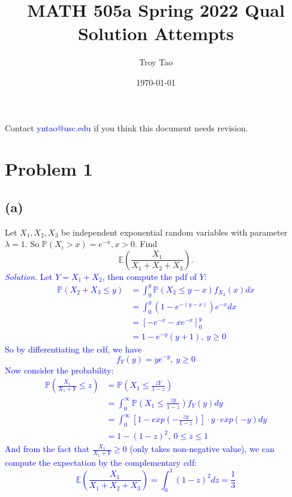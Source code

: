 \documentclass{article}
\title{MATH 505a Spring 2022 Qual Solution Attempts}
\author{Troy Tao}
\date\today
\begin{document}
\maketitle 
Contact \textcolor{blue}{yntao@usc.edu} if you think this document needs revision.

\section*{Problem 1}
\subsection*{(a)}
Let $X_1,X_2,X_3$ be independent exponential random variables with parameter $\lambda=1$. So $\mathbb{P}(X_i>x)=e^{-x},x>0$. Find
$$
    \mathbb{E}\left(\frac{X_1}{X_1+X_2+X_3}\right).
$$
\textcolor{blue}{
    \textit{Solution.} Let $Y = X_1+X_2$, then compute the pdf of $Y$: 
    \begin{equation*}
        \begin{split}
            \mathbb{P}(X_2+X_3\leq y) &=\int_0^y\mathbb{P}(X_2 \leq y-x)f_{X_3}(x)dx\\
            & = \int_0^y (1-e^{-(y-x)})e^{-x}dx\\
            & = \left[-e^{-x}-xe^{-x}\right]_0^y\\
            & = 1-e^{-y}(y+1), \ y \geq 0
        \end{split}
    \end{equation*}
    So by differentiating the cdf, we have
    \begin{equation*}
        f_Y(y) = ye^{-y}, \  y \geq 0
    \end{equation*}
    Now consider the probability:
    \begin{equation*}
        \begin{split}
            \mathbb{P}\left(\frac{X_1}{X_1+Y} \leq z\right) &= \mathbb{P}\left(X_1 \leq \frac{zY}{1-z}\right)\\
                &=\int_0^{\infty}\mathbb{P}\left(X_1 \leq \frac{zy}{1-z}\right)f_Y(y)dy\\
                &=\int_0^{\infty}\left[1-exp\left(-\frac{zy}{1-z}\right)\right]\cdot y \cdot exp(-y)dy\\
                &=1-(1-z)^2, \ 0\leq z \leq 1
        \end{split}
    \end{equation*}
    And from the fact that {\large$\frac{X_1}{X_1+Y}\geq 0$} (only takes non-negative value), we can compute the expectation by the complementary cdf:
    \begin{equation*}
        \mathbb{E}\left(\frac{X_1}{X_1+X_2+X_3}\right)=\int_0^1(1-z)^2dz = \frac{1}{3} 
    \end{equation*}
}
\end{document}
